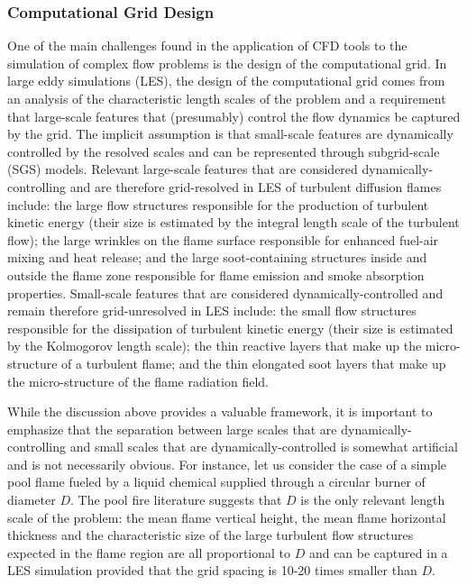 \subsubsection{Computational Grid Design}
\label{sec:CGD}

One of the main challenges found in the application of CFD tools to the simulation of complex flow problems is the design of the computational grid. In large eddy simulations (LES), the design of the computational grid comes from an analysis of the characteristic length scales of the problem and a requirement that large-scale features that (presumably) control the flow dynamics be captured by the grid. The implicit assumption is that small-scale features are dynamically controlled by the resolved scales and can be represented through subgrid-scale (SGS) models. Relevant large-scale features that are considered dynamically-controlling and are therefore grid-resolved in LES of turbulent diffusion flames include: the large flow structures responsible for the production of turbulent kinetic energy (their size is estimated by the integral length scale of the turbulent flow); the large wrinkles on the flame surface responsible for enhanced fuel-air mixing and heat release; and the large soot-containing structures inside and outside the flame zone responsible for flame emission and smoke absorption properties. Small-scale features that are considered dynamically-controlled and remain therefore grid-unresolved in LES include: the small flow structures responsible for the dissipation of turbulent kinetic energy (their size is estimated by the Kolmogorov length scale); the thin reactive layers that make up the micro-structure of a turbulent flame; and the thin elongated soot layers that make up the micro-structure of the flame radiation field.

While the discussion above provides a valuable framework, it is important to emphasize that the separation between large scales that are dynamically-controlling and small scales that are dynamically-controlled is somewhat artificial and is not necessarily obvious. For instance, let us consider the case of a simple pool flame fueled by a liquid chemical supplied through a circular burner of diameter $D$. The pool fire literature suggests that $D$ is the only relevant length scale of the problem: the mean flame vertical height, the mean flame horizontal thickness and the characteristic size of the large turbulent flow structures expected in the flame region are all proportional to $D$ and can be captured in a LES simulation provided that the grid spacing is 10-20 times smaller than $D$.

